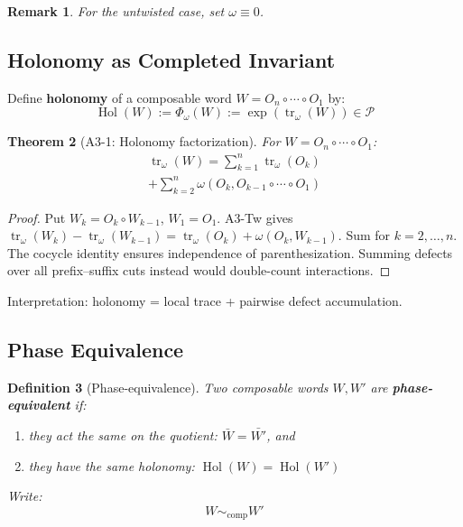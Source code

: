 \documentclass[12pt, oneside]{article}
\newtheorem{theorem}{Theorem}[section]
\newtheorem{definition}[theorem]{Definition}
\newtheorem{remark}[theorem]{Remark}
\DeclareMathOperator{\tr}{tr}
\DeclareMathOperator{\Hol}{Hol}
\begin{document}
\begin{remark}
For the untwisted case, set $\omega \equiv 0$.
\end{remark}

\subsection{Holonomy as Completed Invariant}

Define \textbf{holonomy} of a composable word $W = O_n \circ \cdots \circ O_1$ by:
\begin{equation}
\Hol(W) := \Phi_\omega(W) := \exp(\tr_\omega(W)) \in \mathcal{P}
\end{equation}

\begin{theorem}[A3-1: Holonomy factorization]
For $W = O_n \circ \cdots \circ O_1$:
\begin{multline}
\tr_\omega(W) = \sum_{k=1}^n \tr_\omega(O_k) \\ + \sum_{k=2}^{n} \omega(O_k, O_{k-1} \circ \cdots \circ O_1)
\end{multline}
\end{theorem}

\begin{proof}
Put $W_k=O_k\circ W_{k-1}$, $W_1=O_1$. A3-Tw gives $\tr_\omega(W_k)-\tr_\omega(W_{k-1})=\tr_\omega(O_k)+\omega(O_k,W_{k-1})$. Sum for $k=2,\ldots,n$. The cocycle identity ensures independence of parenthesization. Summing defects over all prefix--suffix cuts instead would double-count interactions.
\end{proof}

Interpretation: holonomy = local trace + pairwise defect accumulation.

\subsection{Phase Equivalence}

\begin{definition}[Phase-equivalence]
Two composable words $W, W'$ are \textbf{phase-equivalent} if:
\begin{enumerate}
    \item they act the same on the quotient: $\bar{W} = \bar{W'}$, and
    \item they have the same holonomy: $\Hol(W) = \Hol(W')$
\end{enumerate}
Write:
\begin{equation}
W \sim_{\text{comp}} W'
\end{equation}
\end{definition}
\end{document}
